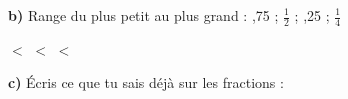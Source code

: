 \begin{center}
\end{center}

\textbf{b)} Range du plus petit au plus grand : ,75 \; ; \; $\frac{1}{2}$ \; ; ,25 \; ; \; $\frac{1}{4}$

\medskip
{} $<$  $<$  $<$ 

\medskip
\textbf{c)} Écris ce que tu sais déjà sur les fractions :

\bl[\linewidth]

\bl[\linewidth]
